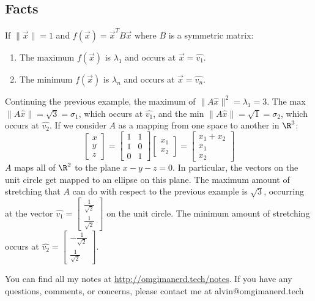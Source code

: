 \documentclass{math}
\begin{document}
\subsection*{Facts}
If \( \|\vec{x}\| = 1 \) and \( f(\vec{x}) = \vec{x}^TB\vec{x} \) where \( B \)
is a symmetric matrix:
\begin{enumerate}[1)]
  \item The maximum \( f(\vec{x}) \) is \( \lambda_1 \) and occurs at
    \( \vec{x} = \hat{v_1} \).
  \item The minimum \( f(\vec{x}) \) is \( \lambda_n \) and occurs at
    \( \vec{x} = \hat{v_n} \).
\end{enumerate}
Continuing the previous example, the maximum of \( \|A\hat{x}\|^2 = \lambda_1 =
3 \). The max \( \|A\hat{x}\| = \sqrt{3} = \sigma_1 \), which occurs at
\( \hat{v_1} \), and the min \( \|A\hat{x}\| = \sqrt{1} = \sigma_2 \), which
occurs at \( \hat{v_2} \). If we consider \( A \) as a mapping from one
space to another in \( \R^3 \):
\[ \begin{bmatrix}x \\ y \\ z\end{bmatrix} = \begin{bmatrix}
  1 & 1 \\
  1 & 0 \\
  0 & 1
\end{bmatrix}\begin{bmatrix}x_1 \\ x_2\end{bmatrix} = \begin{bmatrix}
  x_1+x_2 \\
  x_1 \\
  x_2
\end{bmatrix} \]
\( A \) maps all of \( \R^2 \) to the plane \( x-y-z = 0 \). In particular, the
vectors on the unit circle get mapped to an ellipse on this plane. The maximum
amount of stretching that \( A \) can do with respect to the previous example is
\( \sqrt{3} \), occurring at the vector \( \hat{v_1} = \begin{bmatrix}
\frac{1}{\sqrt{2}} \\ \frac{1}{\sqrt{2}}\end{bmatrix} \) on the unit circle.
The minimum amount of stretching occurs at \( \hat{v_2} = \begin{bmatrix}
-\frac{1}{\sqrt{2}} \\ \frac{1}{\sqrt{2}}\end{bmatrix} \).

\begin{center}
  You can find all my notes at \url{http://omgimanerd.tech/notes}. If you have
  any questions, comments, or concerns, please contact me at
  alvin@omgimanerd.tech
\end{center}
\end{document}

